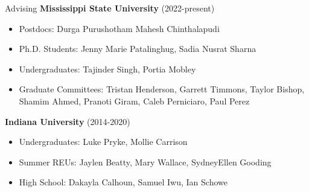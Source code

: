 \documentclass{resume} %
\begin{document}
\begin{rSection}{Advising}
{\bf Mississippi State University} (2022-present)
\begin{itemize}
  \item Postdocs: Durga Purushotham Mahesh Chinthalapudi
  \item Ph.D. Students: Jenny Marie Patalinghug, Sadia Nusrat Sharna
  \item Undergraduates: Tajinder Singh, Portia Mobley
  \item Graduate Committees: Tristan Henderson, Garrett Timmons, Taylor Bishop, Shamim Ahmed, Pranoti Giram, Caleb Perniciaro, Paul Perez
\end{itemize}

{\bf Indiana University} (2014-2020)
\begin{itemize}
  \item Undergraduates: Luke Pryke, Mollie Carrison
  \item Summer REUs: Jaylen Beatty, Mary Wallace, SydneyEllen Gooding
  \item High School: Dakayla Calhoun, Samuel Iwu, Ian Schowe
\end{itemize}
\end{rSection}
\bigskip
\end{document}

